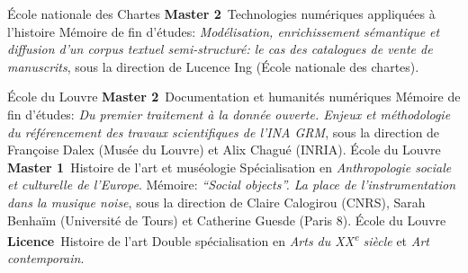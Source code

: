 	{%
		École nationale des Chartes}
	{%
		\textbf{Master 2}~Technologies numériques appliquées à l'histoire}
	{%
		Mémoire de fin d'études: \textit{Modélisation, enrichissement sémantique et diffusion d'un corpus textuel semi-structuré: le cas des catalogues de vente de manuscrits}, sous la direction de Lucence Ing (École nationale des chartes).}

	{%
		École du Louvre}
	{%
		\textbf{Master 2}~Documentation et humanités numériques}
	{%
		Mémoire de fin d'études: \textit{Du premier traitement à la donnée ouverte. Enjeux et méthodologie du référencement des travaux scientifiques de l'INA GRM}, sous la direction de Françoise Dalex (Musée du Louvre) et Alix Chagué (INRIA).}
	{%
		École du Louvre}
	{%
		\textbf{Master 1}~Histoire de l'art et muséologie}
	{%
		Spécialisation en \textit{Anthropologie sociale et culturelle de l'Europe}. Mémoire: \textit{\enquote{Social objects}. La place de l'instrumentation dans la musique \textit{noise}}, sous la direction de Claire Calogirou (CNRS), Sarah Benhaïm (Université de Tours) et Catherine Guesde (Paris 8).}
	{%
		École du Louvre}
	{%
		\textbf{Licence}~Histoire de l'art}
	{%
		Double spécialisation en \textit{Arts du XX\textsuperscript{e} siècle} et \textit{Art contemporain}.}
	